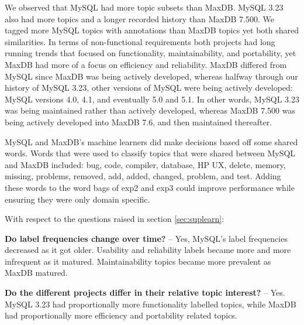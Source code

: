 \documentclass[]{sig-alternate}
\newcommand{\XXX}[1]{\textcolor{red}{{\it \textbf{[XXX: #1]}}}}
\begin{document}
\label{sec:comparison}

We observed that MySQL had more topic subsets than MaxDB. MySQL 3.23 also had more topics and a longer recorded history than MaxDB 7.500. We tagged more MySQL topics with annotations than MaxDB topics yet both shared similarities. In terms of non-functional requirements both projects had long running trends that focused on functionality, maintainability, and portability, yet MaxDB had more of a focus on efficiency and reliability. MaxDB differed from MySQL since MaxDB was being actively developed, whereas halfway through our history of MySQL 3.23, other versions of MySQL were being actively developed: MySQL versions 4.0, 4.1, and eventually 5.0 and 5.1. In other words, MySQL 3.23 was being maintained rather than actively developed, whereas MaxDB 7.500 was being actively developed into MaxDB 7.6, and then maintained thereafter.

MySQL and MaxDB's machine learners did make decisions based off some shared words. Words that were used to classify topics that were shared between MySQL and MaxDB included: \textsf{bug, code, compiler, database, HP UX, delete, memory, missing, problems, removed, add, added, changed, problem, and test}. Adding these words to the word bags of \textsf{exp2} and \textsf{exp3} could improve performance while ensuring they were only domain specific.

With respect to the questions raised in section \ref{sec:suplearn}:

\textbf{Do label frequencies change over time?} -- Yes, MySQL's label
frequencies decreased as it got older. Usability and reliability
labels became more and more infrequent as it matured. Maintainability topics
became more prevalent as MaxDB matured.

\textbf{Do the different projects differ in their relative topic
  interest?} -- Yes. MySQL 3.23 had proportionally more
functionality labelled topics, while MaxDB had proportionally more
efficiency and portability related topics.
 

\end{document}
